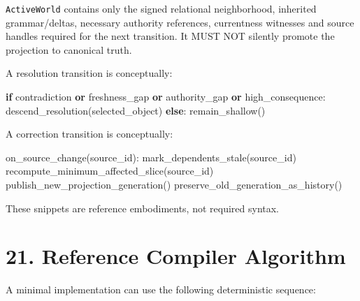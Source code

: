 \documentclass[
  10pt,
  letterpaper,
]{article}
\newenvironment{Shaded}{}{}
\newcommand{\ControlFlowTok}[1]{\textcolor[rgb]{0.00,0.44,0.13}{\textbf{#1}}}
\newcommand{\KeywordTok}[1]{\textcolor[rgb]{0.00,0.44,0.13}{\textbf{#1}}}
\newcommand{\NormalTok}[1]{#1}
\begin{document}
\nolinkurl{ActiveWorld} contains only the signed relational neighborhood,
inherited grammar/deltas, necessary authority references, currentness
witnesses and source handles required for the next transition. It MUST
NOT silently promote the projection to canonical truth.

A resolution transition is conceptually:

\begin{Shaded}
\begin{Highlighting}[]
\ControlFlowTok{if}\NormalTok{ contradiction }\KeywordTok{or}\NormalTok{ freshness\_gap }\KeywordTok{or}\NormalTok{ authority\_gap }\KeywordTok{or}\NormalTok{ high\_consequence:}
\NormalTok{    descend\_resolution(selected\_object)}
\ControlFlowTok{else}\NormalTok{:}
\NormalTok{    remain\_shallow()}
\end{Highlighting}
\end{Shaded}

A correction transition is conceptually:

\begin{Shaded}
\begin{Highlighting}[]
\NormalTok{on\_source\_change(source\_id):}
\NormalTok{    mark\_dependents\_stale(source\_id)}
\NormalTok{    recompute\_minimum\_affected\_slice(source\_id)}
\NormalTok{    publish\_new\_projection\_generation()}
\NormalTok{    preserve\_old\_generation\_as\_history()}
\end{Highlighting}
\end{Shaded}

These snippets are reference embodiments, not required syntax.

\section{21. Reference Compiler
Algorithm}\label{21-reference-compiler-algorithm}

A minimal implementation can use the following deterministic sequence:
\end{document}

